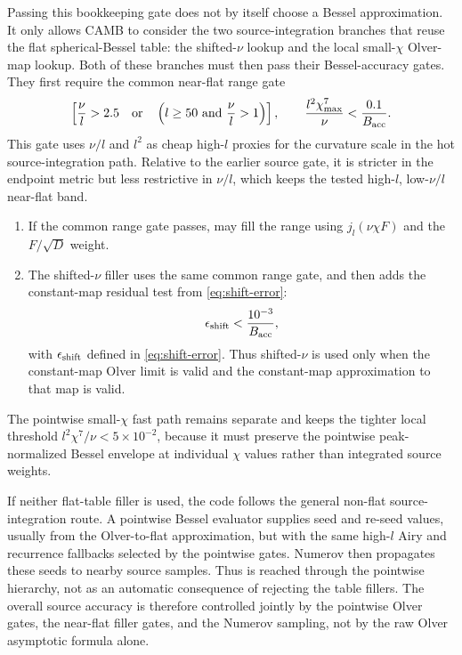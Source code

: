 \documentclass[11pt,a4paper]{article}
\newcommand{\code}[1]{\texttt{\detokenize{#1}}}
\begin{document}
Passing this bookkeeping gate does not by itself choose a Bessel
approximation.  It only allows CAMB to consider the two source-integration
branches that reuse the flat spherical-Bessel table: the shifted-\(\nu\) lookup
and the local small-\(\chi\) Olver-map lookup.  Both of these branches must then
pass their Bessel-accuracy gates.  They first require the common near-flat range
gate
\begin{equation}
  \left[\frac{\nu}{l}>2.5\quad\hbox{or}\quad
  \left(l\ge50\ \hbox{and}\ \frac{\nu}{l}>1\right)\right],\qquad
  \frac{l^2\chi_{\max}^7}{\nu}
  <\frac{0.1}{B_{\rm acc}}.
  \label{eq:source-range-gate}
\end{equation}
This gate uses \(\nu/l\) and \(l^2\) as cheap high-\(l\) proxies for the
curvature scale in the hot source-integration path.  Relative to the earlier
source gate, it is stricter in the endpoint metric but less restrictive in
\(\nu/l\), which keeps the tested high-\(l\), low-\(\nu/l\) near-flat band.
\begin{enumerate}[leftmargin=*]
\item If the common range gate passes, \code{UseNearFlatSmallChiApprox} may fill the range using
\(j_l(\nu\chi F)\) and the \(F/\sqrt D\) weight.
\item The shifted-\(\nu\) filler uses the same common range gate, and then adds the
constant-map residual test from \eqref{eq:shift-error}:
\begin{equation}
  \epsilon_{\rm shift}<\frac{10^{-3}}{B_{\rm acc}},
\end{equation}
with \(\epsilon_{\rm shift}\) defined in \eqref{eq:shift-error}.  Thus
shifted-\(\nu\) is used only when the constant-map Olver limit is valid and the
constant-map approximation to that map is valid.
\end{enumerate}
The pointwise \code{phi_olver} small-\(\chi\) fast path remains separate and
keeps the tighter local threshold
\(l^2\chi^7/\nu<5\times10^{-2}\), because it must preserve the pointwise
peak-normalized Bessel envelope at individual \(\chi\) values rather than
integrated source weights.

If neither flat-table filler is used, the code follows the general non-flat
source-integration route.  A pointwise Bessel evaluator supplies seed and
re-seed values, usually from the Olver-to-flat approximation, but with the
same high-\(l\) Airy and recurrence fallbacks selected by the pointwise gates.
Numerov then propagates these seeds to nearby source samples.  Thus
\code{phi_recurs} is reached through the pointwise hierarchy, not as an
automatic consequence of rejecting the table fillers.
The overall source accuracy is therefore controlled jointly by the pointwise
Olver gates, the near-flat filler gates, and the Numerov sampling, not by the
raw Olver asymptotic formula alone.
\end{document}
